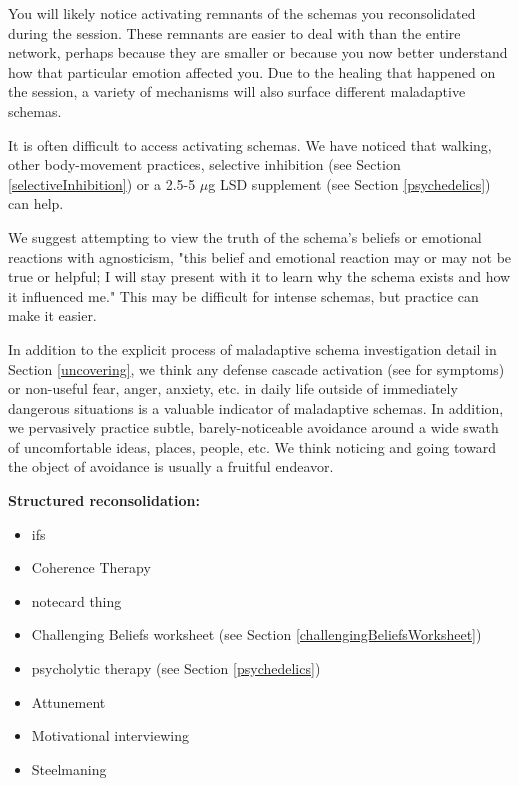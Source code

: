 \documentclass[12pt,letterpaper]{article}
\begin{document}
You will likely notice activating remnants of the schemas you reconsolidated during the session. These remnants are easier to deal with than the entire network, perhaps because they are smaller or because you now better understand how that particular emotion affected you. Due to the healing that happened on the session, a variety of mechanisms will also surface different maladaptive schemas.

It is often difficult to access activating schemas. We have noticed that walking, other body-movement practices, selective inhibition (see Section \ref{selectiveInhibition}) or a 2.5-5 $\mu$g LSD supplement (see Section \ref{psychedelics}) can help.

We suggest attempting to view the truth of the schema's beliefs or emotional reactions with agnosticism, "this belief and emotional reaction may or may not be true or helpful; I will stay present with it to learn why the schema exists and how it influenced me." This may be difficult for intense schemas, but practice can make it easier.

In addition to the explicit process of maladaptive schema investigation detail in Section \ref{uncovering}, we think any defense cascade activation (see \textcite{cheetahSigns} for symptoms) or non-useful fear, anger, anxiety, etc. in daily life outside of immediately dangerous situations is a valuable indicator of maladaptive schemas. In addition, we pervasively practice subtle, barely-noticeable avoidance around a wide swath of uncomfortable ideas, places, people, etc. We think noticing and going toward the object of avoidance is usually a fruitful endeavor.

\vspace{\baselineskip}

\noindent \textbf{Structured reconsolidation:}

\begin{itemize}
	\item ifs
	\item Coherence Therapy
	\item notecard thing
	\item Challenging Beliefs worksheet (see Section \ref{challengingBeliefsWorksheet})
	\item psycholytic therapy (see Section \ref{psychedelics})
	\item Attunement
	\item Motivational interviewing
	\item Steelmaning
\end{itemize}
\end{document}
